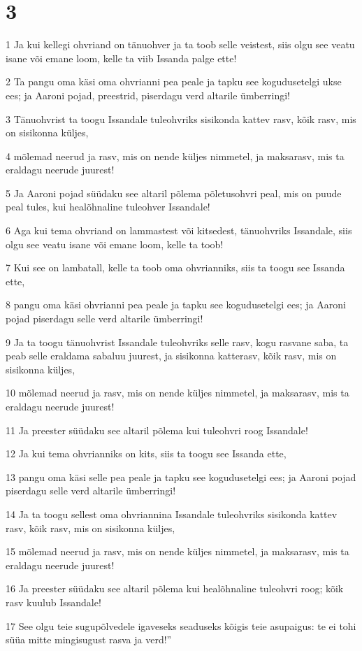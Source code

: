 \chapter{3}

\par 1 Ja kui kellegi ohvriand on tänuohver ja ta toob selle veistest, siis olgu see veatu isane või emane loom, kelle ta viib Issanda palge ette!
\par 2 Ta pangu oma käsi oma ohvrianni pea peale ja tapku see kogudusetelgi ukse ees; ja Aaroni pojad, preestrid, piserdagu verd altarile ümberringi!
\par 3 Tänuohvrist ta toogu Issandale tuleohvriks sisikonda kattev rasv, kõik rasv, mis on sisikonna küljes,
\par 4 mõlemad neerud ja rasv, mis on nende küljes nimmetel, ja maksarasv, mis ta eraldagu neerude juurest!
\par 5 Ja Aaroni pojad süüdaku see altaril põlema põletusohvri peal, mis on puude peal tules, kui healõhnaline tuleohver Issandale!
\par 6 Aga kui tema ohvriand on lammastest või kitsedest, tänuohvriks Issandale, siis olgu see veatu isane või emane loom, kelle ta toob!
\par 7 Kui see on lambatall, kelle ta toob oma ohvrianniks, siis ta toogu see Issanda ette,
\par 8 pangu oma käsi ohvrianni pea peale ja tapku see kogudusetelgi ees; ja Aaroni pojad piserdagu selle verd altarile ümberringi!
\par 9 Ja ta toogu tänuohvrist Issandale tuleohvriks selle rasv, kogu rasvane saba, ta peab selle eraldama sabaluu juurest, ja sisikonna katterasv, kõik rasv, mis on sisikonna küljes,
\par 10 mõlemad neerud ja rasv, mis on nende küljes nimmetel, ja maksarasv, mis ta eraldagu neerude juurest!
\par 11 Ja preester süüdaku see altaril põlema kui tuleohvri roog Issandale!
\par 12 Ja kui tema ohvrianniks on kits, siis ta toogu see Issanda ette,
\par 13 pangu oma käsi selle pea peale ja tapku see kogudusetelgi ees; ja Aaroni pojad piserdagu selle verd altarile ümberringi!
\par 14 Ja ta toogu sellest oma ohvriannina Issandale tuleohvriks sisikonda kattev rasv, kõik rasv, mis on sisikonna küljes,
\par 15 mõlemad neerud ja rasv, mis on nende küljes nimmetel, ja maksarasv, mis ta eraldagu neerude juurest!
\par 16 Ja preester süüdaku see altaril põlema kui healõhnaline tuleohvri roog; kõik rasv kuulub Issandale!
\par 17 See olgu teie sugupõlvedele igaveseks seaduseks kõigis teie asupaigus: te ei tohi süüa mitte mingisugust rasva ja verd!”

